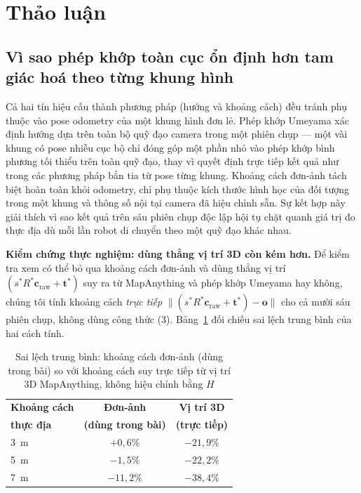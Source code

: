 \documentclass[10pt,a4paper,twocolumn]{article}
\begin{document}
\section{Thảo luận}

\subsection{Vì sao phép khớp toàn cục ổn định hơn tam giác hoá theo từng khung hình}
\label{sec:global-fit-stable}

Cả hai tín hiệu cấu thành phương pháp (hướng và khoảng cách) đều tránh phụ thuộc vào pose odometry của một khung hình đơn lẻ. Phép khớp Umeyama xác định hướng dựa trên toàn bộ quỹ đạo camera trong một phiên chụp — một vài khung có pose nhiễu cục bộ chỉ đóng góp một phần nhỏ vào phép khớp bình phương tối thiểu trên toàn quỹ đạo, thay vì quyết định trực tiếp kết quả như trong các phương pháp bắn tia từ pose từng khung. Khoảng cách đơn-ảnh tách biệt hoàn toàn khỏi odometry, chỉ phụ thuộc kích thước hình học của đối tượng trong một khung và thông số nội tại camera đã hiệu chỉnh sẵn. Sự kết hợp này giải thích vì sao kết quả trên sáu phiên chụp độc lập hội tụ chặt quanh giá trị đo thực địa dù mỗi lần robot di chuyển theo một quỹ đạo khác nhau.

\textbf{Kiểm chứng thực nghiệm: dùng thẳng vị trí 3D còn kém hơn.} Để kiểm tra xem có thể bỏ qua khoảng cách đơn-ảnh và dùng thẳng vị trí $(s^*R^*\mathbf{c}_{\text{raw}}+\mathbf{t}^*)$ suy ra từ MapAnything và phép khớp Umeyama hay không, chúng tôi tính khoảng cách \emph{trực tiếp} $\lVert (s^*R^*\mathbf{c}_{\text{raw}}+\mathbf{t}^*) - \mathbf{o} \rVert$ cho cả mười sáu phiên chụp, không dùng công thức (3). Bảng~\ref{tab:3d-vs-mono} đối chiếu sai lệch trung bình của hai cách tính.

\begin{table}[H]
\centering
\small
\caption{Sai lệch trung bình: khoảng cách đơn-ảnh (dùng trong bài) so với khoảng cách suy trực tiếp từ vị trí 3D MapAnything, không hiệu chỉnh bằng $H$}
\label{tab:3d-vs-mono}
\begin{tabular}{@{}lcc@{}}
\toprule
\textbf{Khoảng cách} & \textbf{Đơn-ảnh} & \textbf{Vị trí 3D} \\
\textbf{thực địa} & \textbf{(dùng trong bài)} & \textbf{(trực tiếp)} \\
\midrule
\SI{3}{\meter} & $+0{,}6\%$ & $-21{,}9\%$ \\
\SI{5}{\meter} & $-1{,}5\%$ & $-22{,}2\%$ \\
\SI{7}{\meter} & $-11{,}2\%$ & $-38{,}4\%$ \\
\bottomrule
\end{tabular}
\end{table}
\end{document}

